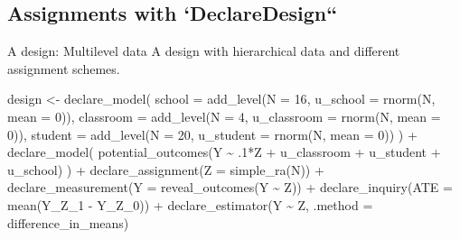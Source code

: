 \documentclass[
  11pt,
  ignorenonframetext,
]{beamer}
\newenvironment{Shaded}{\begin{snugshade}}{\end{snugshade}}
\newcommand{\AttributeTok}[1]{\textcolor[rgb]{0.40,0.45,0.13}{#1}}
\newcommand{\DecValTok}[1]{\textcolor[rgb]{0.68,0.00,0.00}{#1}}
\newcommand{\FunctionTok}[1]{\textcolor[rgb]{0.28,0.35,0.67}{#1}}
\newcommand{\NormalTok}[1]{\textcolor[rgb]{0.00,0.23,0.31}{#1}}
\newcommand{\OtherTok}[1]{\textcolor[rgb]{0.00,0.23,0.31}{#1}}
\newcommand{\SpecialCharTok}[1]{\textcolor[rgb]{0.37,0.37,0.37}{#1}}
\begin{document}
\hypertarget{assignments-with-declaredesign}{%
\subsection{Assignments with
`DeclareDesign``}\label{assignments-with-declaredesign}}

\begin{frame}[fragile]{A design: Multilevel data}
\protect\hypertarget{a-design-multilevel-data}{}
A design with hierarchical data and different assignment schemes.

\begin{Shaded}
\begin{Highlighting}[]
\NormalTok{design }\OtherTok{\textless{}{-}} 
  \FunctionTok{declare\_model}\NormalTok{(}
    \AttributeTok{school =} \FunctionTok{add\_level}\NormalTok{(}\AttributeTok{N =} \DecValTok{16}\NormalTok{, }
                       \AttributeTok{u\_school =} \FunctionTok{rnorm}\NormalTok{(N, }\AttributeTok{mean =} \DecValTok{0}\NormalTok{)),     }
    \AttributeTok{classroom =} \FunctionTok{add\_level}\NormalTok{(}\AttributeTok{N =} \DecValTok{4}\NormalTok{,    }
                  \AttributeTok{u\_classroom =} \FunctionTok{rnorm}\NormalTok{(N, }\AttributeTok{mean =} \DecValTok{0}\NormalTok{)),}
    \AttributeTok{student =}  \FunctionTok{add\_level}\NormalTok{(}\AttributeTok{N =} \DecValTok{20}\NormalTok{,    }
                         \AttributeTok{u\_student =} \FunctionTok{rnorm}\NormalTok{(N, }\AttributeTok{mean =} \DecValTok{0}\NormalTok{))}
\NormalTok{    ) }\SpecialCharTok{+}
  \FunctionTok{declare\_model}\NormalTok{(}
    \FunctionTok{potential\_outcomes}\NormalTok{(Y }\SpecialCharTok{\textasciitilde{}}\NormalTok{ .}\DecValTok{1}\SpecialCharTok{*}\NormalTok{Z }\SpecialCharTok{+}\NormalTok{ u\_classroom }\SpecialCharTok{+}\NormalTok{ u\_student }\SpecialCharTok{+}\NormalTok{ u\_school)}
\NormalTok{    ) }\SpecialCharTok{+}
  \FunctionTok{declare\_assignment}\NormalTok{(}\AttributeTok{Z =} \FunctionTok{simple\_ra}\NormalTok{(N)) }\SpecialCharTok{+} 
  \FunctionTok{declare\_measurement}\NormalTok{(}\AttributeTok{Y =} \FunctionTok{reveal\_outcomes}\NormalTok{(Y }\SpecialCharTok{\textasciitilde{}}\NormalTok{ Z))  }\SpecialCharTok{+}
  \FunctionTok{declare\_inquiry}\NormalTok{(}\AttributeTok{ATE =} \FunctionTok{mean}\NormalTok{(Y\_Z\_1 }\SpecialCharTok{{-}}\NormalTok{ Y\_Z\_0)) }\SpecialCharTok{+} 
  \FunctionTok{declare\_estimator}\NormalTok{(Y }\SpecialCharTok{\textasciitilde{}}\NormalTok{ Z, }\AttributeTok{.method =}\NormalTok{ difference\_in\_means)    }
\end{Highlighting}
\end{Shaded}
\end{frame}
\end{document}

